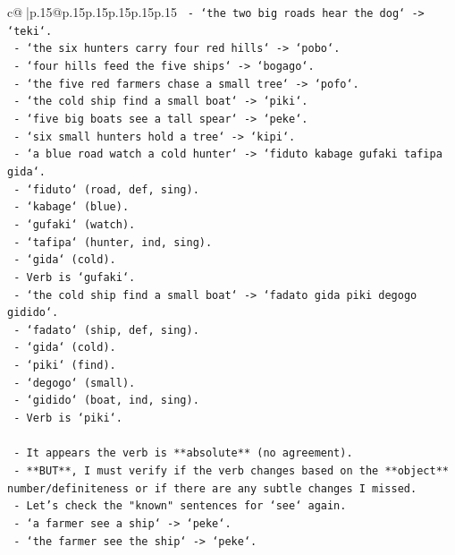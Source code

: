 \documentclass{article}
\begin{document}
{\begin{supertabular}{c@{$\;$}|p{.15\linewidth}@{}p{.15\linewidth}p{.15\linewidth}p{.15\linewidth}p{.15\linewidth}p{.15\linewidth}}
{{{\texttt{   {-} `the two big roads hear the dog` {-}> `teki`.} \\
\texttt{   {-} `the six hunters carry four red hills` {-}> `pobo`.} \\
\texttt{   {-} `four hills feed the five ships` {-}> `bogago`.} \\
\texttt{   {-} `the five red farmers chase a small tree` {-}> `pofo`.} \\
\texttt{   {-} `the cold ship find a small boat` {-}> `piki`.} \\
\texttt{   {-} `five big boats see a tall spear` {-}> `peke`.} \\
\texttt{   {-} `six small hunters hold a tree` {-}> `kipi`.} \\
\texttt{   {-} `a blue road watch a cold hunter` {-}> `fiduto kabage gufaki tafipa gida`.} \\
\texttt{     {-} `fiduto` (road, def, sing).} \\
\texttt{     {-} `kabage` (blue).} \\
\texttt{     {-} `gufaki` (watch).} \\
\texttt{     {-} `tafipa` (hunter, ind, sing).} \\
\texttt{     {-} `gida` (cold).} \\
\texttt{     {-} Verb is `gufaki`.} \\
\texttt{   {-} `the cold ship find a small boat` {-}> `fadato gida piki degogo gidido`.} \\
\texttt{     {-} `fadato` (ship, def, sing).} \\
\texttt{     {-} `gida` (cold).} \\
\texttt{     {-} `piki` (find).} \\
\texttt{     {-} `degogo` (small).} \\
\texttt{     {-} `gidido` (boat, ind, sing).} \\
\texttt{     {-} Verb is `piki`.} \\
\\ 
\texttt{   {-} It appears the verb is **absolute** (no agreement).} \\
\texttt{   {-} **BUT**, I must verify if the verb changes based on the **object** number/definiteness or if there are any subtle changes I missed.} \\
\texttt{   {-} Let's check the "known" sentences for `see` again.} \\
\texttt{     {-} `a farmer see a ship` {-}> `peke`.} \\
\texttt{     {-} `the farmer see the ship` {-}> `peke`.} \\
}}}
\end{supertabular}}
\end{document}

